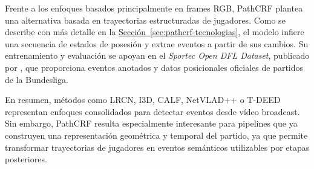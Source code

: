 Frente a los enfoques basados principalmente en frames RGB, PathCRF \citep{KimPathCRF2026} plantea una alternativa basada en trayectorias estructuradas de jugadores. Como se describe con más detalle en la \hyperref[sec:pathcrf-tecnologias]{Sección~\ref*{sec:pathcrf-tecnologias}}, el modelo infiere una secuencia de estados de posesión y extrae eventos a partir de sus cambios. Su entrenamiento y evaluación se apoyan en el \textit{Sportec Open DFL Dataset}, publicado por \citet{BassekIntegratedDataset2025}, que proporciona eventos anotados y datos posicionales oficiales de partidos de la Bundesliga.

En resumen, métodos como LRCN, I3D, CALF, NetVLAD++ o T-DEED representan enfoques consolidados para detectar eventos desde vídeo broadcast. Sin embargo, PathCRF resulta especialmente interesante para pipelines que ya construyen una representación geométrica y temporal del partido, ya que permite transformar trayectorias de jugadores en eventos semánticos utilizables por etapas posteriores.